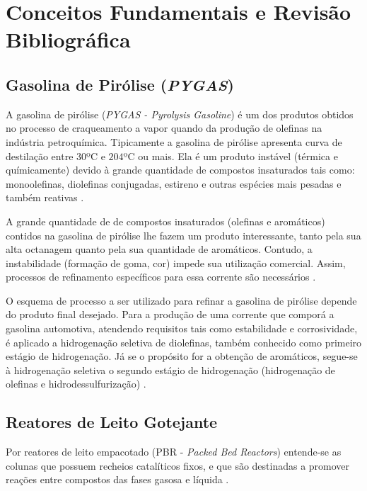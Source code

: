%
% 
%
\chapter{Conceitos Fundamentais e Revisão Bibliográfica}
\label{chap:revisaobibliografica}

\section{Gasolina de Pirólise (\emph{PYGAS})} \label{sec:pygas}
A gasolina de pirólise (\emph{PYGAS - Pyrolysis Gasoline}) é um dos produtos
obtidos no processo de craqueamento a vapor quando da produção de olefinas na
indústria petroquímica. Tipicamente a gasolina de pirólise apresenta curva de
destilação entre $30$\si{ºC} e $204$\si{ºC} ou mais. Ela é um produto instável
(térmica e químicamente) devido à grande quantidade de compostos insaturados
tais como: monoolefinas, diolefinas conjugadas, estireno e outras espécies mais
pesadas e também reativas \cite{Cheng1986}.
 
A grande quantidade de de compostos insaturados (olefinas e aromáticos) contidos
na gasolina de pirólise lhe fazem um produto interessante, tanto pela
sua alta octanagem quanto pela sua quantidade de aromáticos. Contudo, a
instabilidade (formação de goma, cor) impede sua utilização comercial. Assim,
processos de refinamento específicos para essa corrente são necessários
\cite{Derrien1986}.

O esquema de processo a ser utilizado para refinar a gasolina de pirólise
depende do produto final desejado. Para a produção de uma corrente que
comporá a gasolina automotiva, atendendo requisitos tais como estabilidade e
corrosividade, é aplicado a hidrogenação seletiva de diolefinas, também
conhecido como primeiro estágio de hidrogenação. Já se o propósito for a
obtenção de aromáticos, segue-se à hidrogenação seletiva o segundo estágio
de hidrogenação (hidrogenação de olefinas e hidrodessulfurização)
\cite{Derrien1986}.

\section{Reatores de Leito Gotejante} \label{sec:reatorestbr} 

Por reatores de leito empacotado (PBR - \emph{Packed Bed Reactors}) entende-se
as colunas que possuem recheios catalíticos fixos, e que são destinadas a
promover reações entre compostos das fases gasosa e líquida \cite{Froment2011}.

